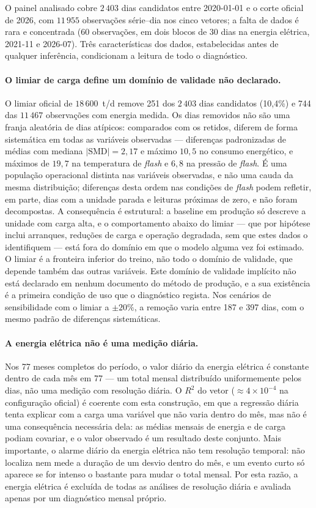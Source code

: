 O painel analisado cobre $2\,403$ dias candidatos entre 2020-01-01 e o corte
oficial de 2026, com $11\,955$ observações série--dia nos cinco vetores; a
falta de dados é rara e concentrada (60 observações, em dois blocos de 30 dias
na energia elétrica, 2021-11 e 2026-07). Três características dos dados,
estabelecidas antes de qualquer inferência, condicionam a leitura de todo o
diagnóstico.

\paragraph{O limiar de carga define um domínio de validade não declarado.}
O limiar oficial de $18\,600$~t/d remove 251 dos $2\,403$ dias candidatos
(10{,}4\%) e 744 das $11\,467$ observações com energia medida. Os dias
removidos não são uma franja aleatória de dias atípicos: comparados com os
retidos, diferem de forma sistemática em todas as variáveis observadas ---
diferenças padronizadas de médias com mediana $|\mathrm{SMD}|=2{,}17$ e máximo
$10{,}5$ no consumo energético, e máximos de $19{,}7$ na temperatura de
\emph{flash} e $6{,}8$ na pressão de \emph{flash}. É uma população operacional
distinta nas variáveis observadas, e não uma cauda da mesma distribuição;
diferenças desta ordem nas condições de \emph{flash} podem refletir, em parte,
dias com a unidade parada e leituras próximas de zero, e não foram
decompostas. A consequência é estrutural: a baseline em produção só descreve
a unidade com carga alta, e o comportamento abaixo do limiar --- que por
hipótese inclui arranques, reduções de carga e operação degradada, sem que
estes dados o identifiquem --- está fora do domínio em que o modelo alguma
vez foi estimado. O limiar é a fronteira inferior do treino, não todo o
domínio de validade, que depende também das outras variáveis. Este domínio de validade implícito não está declarado em nenhum
documento do método de produção, e a sua existência é a primeira condição de
uso que o diagnóstico regista. Nos cenários de sensibilidade com o limiar a
$\pm 20\%$, a remoção varia entre 187 e 397 dias, com o mesmo padrão de
diferenças sistemáticas.

\paragraph{A energia elétrica não é uma medição diária.} Nos 77 meses
completos do período, o valor diário da energia elétrica é constante dentro de
cada mês em 77 --- um total mensal distribuído uniformemente pelos dias, não
uma medição com resolução diária. O $R^2$ do vetor ($\approx 4\times 10^{-4}$ na
configuração oficial) é coerente com esta construção, em que a regressão
diária tenta explicar com a carga uma variável que não varia dentro do mês,
mas não é uma consequência necessária dela: as médias mensais de energia e
de carga podiam covariar, e o valor observado é um resultado deste
conjunto. Mais importante, o alarme diário da energia elétrica não tem
resolução temporal: não localiza nem mede a duração de um desvio dentro do
mês, e um evento curto só aparece se for intenso o bastante para mudar o
total mensal. Por esta razão, a energia
elétrica é excluída de todas as análises de resolução diária e avaliada
apenas por um diagnóstico mensal próprio.

